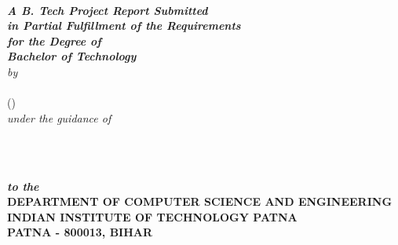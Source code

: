 \begin{titlepage}
\begin{center}
\textheight 15.5in \textwidth 12.5in {\large\sf  \textbf{\the\btptitle}}\\[12ex]
{\small{\textsl{ \textbf{A B. Tech Project Report Submitted \\
in Partial Fulfillment of the Requirements \\
for the Degree of
\\[3ex]\small \bf Bachelor of Technology}}}}\\[16ex] \emph{by} \\[2ex]
{\sf \sf \textbf{\the\name}\\
             (\the\rollno)}\\[1ex]
\emph{under the guidance of}\\[2ex]
{\sf \bf \the\guide} \\[7ex]

\vspace{1in}

 \begin{figure}[!h]
 \hfill
  \hfill \
 \end{figure}

{\sl \bf{to the}} \\[1ex]

{\small\bf DEPARTMENT OF COMPUTER SCIENCE AND ENGINEERING}  \\[1ex]
{\small \bf{INDIAN INSTITUTE OF TECHNOLOGY PATNA \\PATNA - 800013,
BIHAR}}
%
\end{center}
\end{titlepage}
